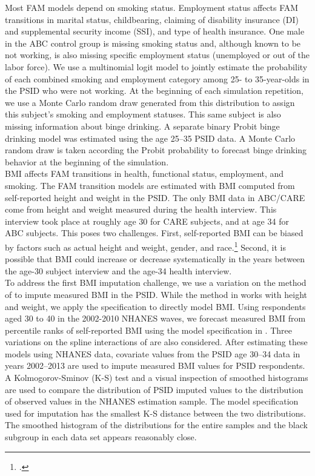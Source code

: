 \noindent Most FAM models depend on smoking status. Employment status affects FAM transitions in marital status, childbearing, claiming of disability insurance (DI) and supplemental security income (SSI), and type of health insurance.
One male in the ABC control group is missing smoking status and, although known to be not working, is also missing specific employment status (unemployed or out of the labor force).
 We use a multinomial logit model to jointly estimate the probability of each combined smoking and employment category among 25- to 35-year-olds in the PSID who were not working. At the beginning of each simulation repetition, we use a Monte Carlo random draw generated from this distribution to assign this subject's smoking and employment statuses. This same subject is also missing information about binge drinking. A separate binary Probit binge drinking model was estimated using the age 25--35 PSID data. A Monte Carlo random draw is taken according the Probit probability to forecast binge drinking behavior at the beginning of the simulation. \\

\noindent BMI affects FAM transitions in health, functional status, employment, and smoking.
The FAM transition models are estimated with BMI computed from self-reported height and weight in the PSID.
The only BMI data in ABC/CARE come from height and weight measured during the health interview. This interview took place at roughly age 30 for CARE subjects, and at age 34 for ABC subjects.
This poses two challenges.
First, self-reported BMI can be biased by factors such as actual height and weight, gender, and race.\footnote{\citet{Cawley_2004_JHR}.}
Second, it is possible that BMI could increase or decrease systematically in the years between the age-30 subject interview and the age-34 health interview. \\

\noindent To address the first BMI imputation challenge, we use a variation on the method of \citet*{Courtemanche_etal_2015_Adjusting-Body-Mass} to impute measured BMI in the PSID.
While the method in \citet{Courtemanche_etal_2015_Adjusting-Body-Mass} works with height and weight, we apply the specification to directly model BMI. Using respondents aged 30 to 40 in the 2002-2010 NHANES waves, we forecast measured BMI from percentile ranks of self-reported BMI using the model specification in \citet{Courtemanche_etal_2015_Adjusting-Body-Mass}. Three variations
on the spline interactions of \citet{Courtemanche_etal_2015_Adjusting-Body-Mass} are also considered. After estimating these models using NHANES data, covariate values from the PSID
age 30--34 data in years 2002--2013 are used to impute measured BMI values for PSID respondents. A Kolmogorov-Sminov (K-S) test and a visual inspection of smoothed histograms are used to compare the distribution of PSID imputed values to the distribution of observed values in the NHANES estimation sample. The model specification used for imputation has the smallest K-S distance between the two distributions. The smoothed histogram of the distributions for the entire samples and the black subgroup in each data set appears reasonably close.  \\

